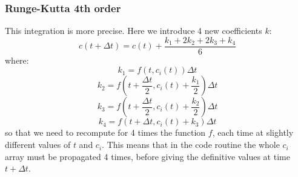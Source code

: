 \subsubsection{Runge-Kutta 4th order}
This integration is more precise. Here we introduce 4 new coefficients $k$:
\begin{equation}
c (t + \Delta t) = c(t) + \dfrac{k_1+2k_2+2k_3+k_4}{6}
\end{equation}
where:
\begin{equation}
k_1=f(t,c_i(t)) \Delta t
\end{equation}
\begin{equation}
k_2=f\left(t + \dfrac{\Delta t}{2},c_i(t) + \dfrac{k_1}{2}\right) \Delta t
\end{equation}
\begin{equation}
k_3=f\left(t + \dfrac{\Delta t}{2},c_i(t) + \dfrac{k_2}{2}\right) \Delta t
\end{equation}
\begin{equation}
k_4=f\left(t + \Delta t,c_i(t) + k_3\right) \Delta t
\end{equation}
so that we need to recompute for 4 times the function $f$, each time at slightly different values of $t$ and $c_i$. This means that in the code routine the whole $c_i$ array must be propagated 4 times, before giving the definitive values at time $t+\Delta t$.

